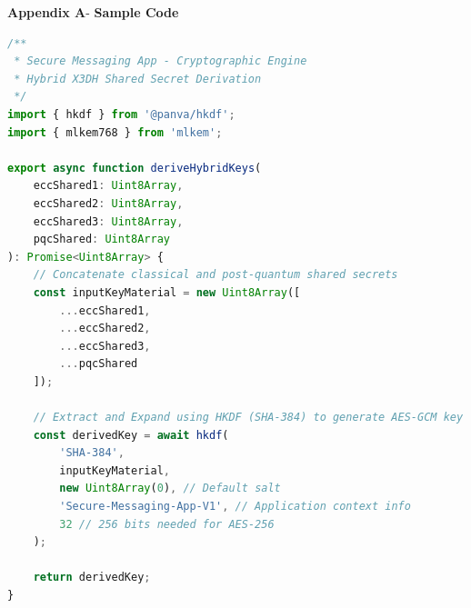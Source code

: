 \begin{center}
	{\Large \textbf{Appendix A}}-\vspace*{0.5 cm}
	{\Large \textbf{Sample Code}}
	
\end{center}
\begin{lstlisting}[language=TypeScript]
/**
 * Secure Messaging App - Cryptographic Engine
 * Hybrid X3DH Shared Secret Derivation
 */
import { hkdf } from '@panva/hkdf';
import { mlkem768 } from 'mlkem';

export async function deriveHybridKeys(
    eccShared1: Uint8Array,
    eccShared2: Uint8Array,
    eccShared3: Uint8Array,
    pqcShared: Uint8Array
): Promise<Uint8Array> {
    // Concatenate classical and post-quantum shared secrets 
    const inputKeyMaterial = new Uint8Array([
        ...eccShared1,
        ...eccShared2,
        ...eccShared3,
        ...pqcShared
    ]);
    
    // Extract and Expand using HKDF (SHA-384) to generate AES-GCM key
    const derivedKey = await hkdf(
        'SHA-384',
        inputKeyMaterial,
        new Uint8Array(0), // Default salt
        'Secure-Messaging-App-V1', // Application context info
        32 // 256 bits needed for AES-256
    );
    
    return derivedKey;
}
\end{lstlisting}
